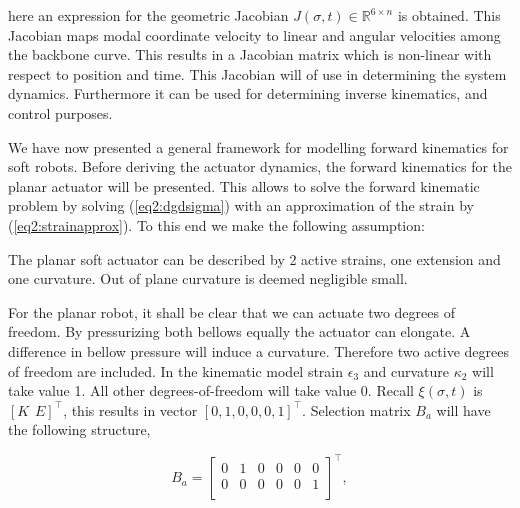 here an expression for the geometric Jacobian $J(\sigma,t) \in \mathbb{R}^{6\times n}$ is obtained. This Jacobian maps modal coordinate velocity to linear and angular velocities among the backbone curve. This results in a Jacobian matrix which is non-linear with respect to position and time. This Jacobian will of use in determining the system dynamics. Furthermore it can be used for determining inverse kinematics, and control purposes.




We have now presented a general framework for modelling forward kinematics for soft robots. Before deriving the actuator dynamics, the forward kinematics for the planar actuator will be presented.  This allows to solve the forward kinematic problem by solving (\ref{eq2:dgdsigma}) with an approximation of the strain by (\ref{eq2:strainapprox}). To this end we make the following assumption:


\begin{theorem}
The planar soft actuator can be described by 2 active strains, one extension and one curvature. Out of plane curvature is deemed negligible small.
\end{theorem}

For the planar robot, it shall be clear that we can actuate two degrees of freedom. By pressurizing both bellows equally the actuator can elongate. A difference in bellow pressure will induce a curvature. Therefore two active degrees of freedom are included. In the kinematic model strain $\epsilon_3$ and curvature $\kappa_2$ will take value 1. All other degrees-of-freedom will take value 0. Recall $\xi(\sigma,t)$ is $[K \hspace{5pt} E]^\top$, this results in vector $[0,1,0,0,0,1]^\top$. Selection matrix $B_a$ will have the following structure,

\begin{equation}
    B_a = \begin{bmatrix}
    0 & 1 & 0 & 0 & 0 & 0 \\
    0 & 0 & 0 & 0 & 0 & 1 \\
    \end{bmatrix}^\top,
\end{equation}

